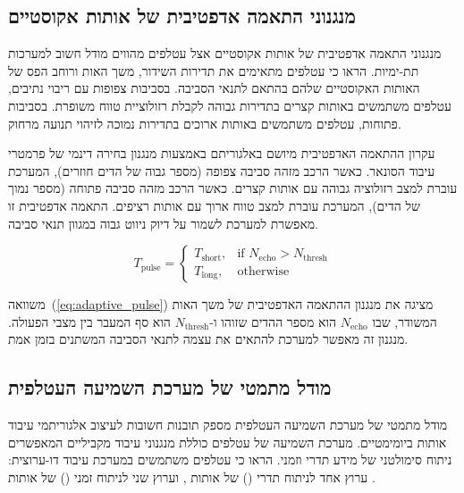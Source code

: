 \subsection{מנגנוני התאמה אדפטיבית של אותות אקוסטיים}
\label{sec:adaptive_signal_adaptation}

מנגנוני התאמה אדפטיבית של אותות אקוסטיים אצל עטלפים מהווים מודל חשוב למערכות  תת-ימיות. \citet{MossEcholocation} הראו כי עטלפים מתאימים את תדירות השידור, משך האות ורוחב הפס של האותות האקוסטיים שלהם בהתאם לתנאי הסביבה. בסביבות צפופות עם ריבוי נתיבים, עטלפים משתמשים באותות  קצרים בתדירות גבוהה לקבלת רזולוציית טווח משופרת. בסביבות פתוחות, עטלפים משתמשים באותות  ארוכים בתדירות נמוכה לזיהוי תנועה מרחוק.

עקרון ההתאמה האדפטיבית מיושם באלגוריתם  באמצעות מנגנון בחירה דינמי של פרמטרי עיבוד הסונאר. כאשר הרכב מזהה סביבה צפופה (מספר גבוה של הדים חוזרים), המערכת עוברת למצב רזולוציה גבוהה עם אותות  קצרים. כאשר הרכב מזהה סביבה פתוחה (מספר נמוך של הדים), המערכת עוברת למצב טווח ארוך עם אותות  רציפים. התאמה אדפטיבית זו מאפשרת למערכת לשמור על דיוק ניווט גבוה במגוון תנאי סביבה.

\begin{equation}
T_{\text{pulse}} = \begin{cases}
T_{\text{short}}, & \text{if } N_{\text{echo}} > N_{\text{thresh}} \\
T_{\text{long}}, & \text{otherwise}
\end{cases}
\label{eq:adaptive_pulse}
\end{equation}

משוואה~(\ref{eq:adaptive_pulse}) מציגה את מנגנון ההתאמה האדפטיבית של משך האות המשודר, שבו $N_{\text{echo}}$ הוא מספר ההדים שזוהו ו-$N_{\text{thresh}}$ הוא סף המעבר בין מצבי הפעולה. מנגנון זה מאפשר למערכת להתאים את עצמה לתנאי הסביבה המשתנים בזמן אמת.

\subsection{מודל מתמטי של מערכת השמיעה העטלפית}
\label{sec:bat_auditory_model}

מודל מתמטי של מערכת השמיעה העטלפית מספק תובנות חשובות לעיצוב אלגוריתמי עיבוד אותות ביומימטיים. מערכת השמיעה של עטלפים כוללת מנגנוני עיבוד מקביליים המאפשרים ניתוח סימולטני של מידע תדרי וזמני. \citet{Schnitzler1968DSC} הראו כי עטלפים משתמשים במערכת עיבוד דו-ערוצית: ערוץ אחד לניתוח תדרי () של אותות , וערוץ שני לניתוח זמני () של אותות .

